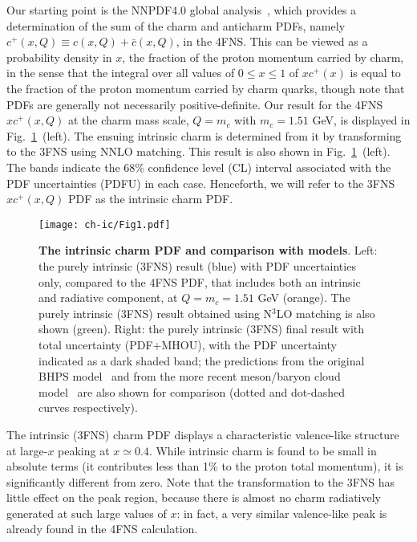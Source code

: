 Our starting point is the NNPDF4.0 global
analysis~\cite{Ball:2021leu}, which provides a determination of
the sum of the charm and
anticharm PDFs, namely  $c^+(x,Q)\equiv c(x,Q)+\bar  c(x,Q)$, in the
4FNS. 
This can be viewed 
as a probability density in $x$, the fraction of the proton momentum
carried by charm, in the sense that the integral over all 
values of $0\le x\le1$ of 
$xc^+(x)$ is equal to  the fraction of
the proton momentum carried by charm quarks, though note that PDFs are
generally not necessarily positive-definite. 
%
Our result for  the 4FNS $xc^+(x,Q)$  at
the charm mass scale, $Q=m_c$ with $m_c=1.51$ GeV, 
is displayed in Fig.~\ref{fig:ic/charm_content_3fns}~(left).
%
%
The ensuing intrinsic charm is determined from it
by transforming to the 3FNS using
NNLO matching.
%
This result is also shown 
in Fig.~\ref{fig:ic/charm_content_3fns}~(left).
The bands  indicate the 68\% confidence level (CL) interval
associated with the PDF uncertainties  (PDFU) in each case.  Henceforth, we will refer to
the  3FNS $xc^+(x,Q)$ PDF as the
intrinsic charm PDF. 

\begin{figure}[h]
  \begin{center}
    \texttt{[image: ch-ic/Fig1.pdf]}
    \caption{\small  \textbf{ The intrinsic charm PDF
      and comparison with models}.
%
      Left: the purely
      intrinsic (3FNS) result (blue)
      with PDF uncertainties only, compared to the 4FNS PDF, that
      includes both an intrinsic and radiative
      component,   at
      $Q=m_c=1.51$ GeV (orange). The purely intrinsic (3FNS)
      result obtained using N$^3$LO matching is also shown (green).
      Right: the purely
      intrinsic (3FNS)
      final result with total uncertainty (PDF+MHOU), with the PDF
      uncertainty indicated as a dark shaded band;
the predictions from the original 
BHPS model~\cite{Brodsky:1980pb} and from the more recent meson/baryon
      cloud model~\cite{Hobbs:2013bia} are also shown for comparison
      (dotted and dot-dashed curves respectively).
         \label{fig:ic/charm_content_3fns} }
\end{center}
\end{figure}

The intrinsic (3FNS) charm PDF
displays a characteristic valence-like
 structure at large-$x$ peaking at $x\simeq 0.4$.
%
 While intrinsic charm is found to be small in absolute terms
 (it contributes less than 1\% to the proton  total momentum),
 it is significantly different from zero.
%
 Note that the transformation to the 3FNS has little effect on the peak region,
 because there is almost no charm radiatively generated at such large values of $x$: in
 fact, a very similar valence-like peak is already found in the 4FNS calculation.


